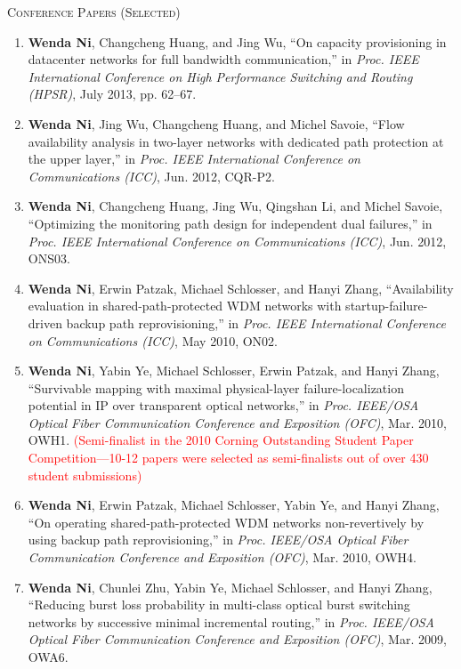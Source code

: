 \documentclass[letterpaper,11pt]{article}
\newcommand{\resheading}[1]{{\noindent\large \colorbox{mygrey}{
\begin{minipage}{1.0\textwidth}{\textsc{#1 \vphantom{p\^{E}}}}\end{minipage}}}}
\begin{document}
\resheading{Conference Papers (Selected)}%

\begin{enumerate}
\item
\textbf{Wenda Ni}, Changcheng Huang, and Jing Wu, ``On capacity provisioning in datacenter networks for full bandwidth communication,'' in \textit{Proc. IEEE International Conference on High Performance Switching and Routing (HPSR)}, July 2013, pp. 62--67.

\item
\textbf{Wenda Ni}, Jing Wu, Changcheng Huang, and Michel Savoie, ``Flow availability analysis in two-layer networks with dedicated path protection at the upper layer,'' in \textit{Proc. IEEE International Conference on Communications (ICC)}, Jun. 2012, CQR-P2.

\item
\textbf{Wenda Ni}, Changcheng Huang, Jing Wu, Qingshan Li, and Michel Savoie, ``Optimizing the monitoring path design for independent dual failures,'' in \textit{Proc. IEEE International Conference on Communications (ICC)}, Jun. 2012, ONS03.

\item
\textbf{Wenda Ni}, Erwin Patzak, Michael Schlosser, and Hanyi Zhang, ``Availability evaluation in shared-path-protected WDM networks with startup-failure-driven backup path reprovisioning,'' in \textit{Proc. IEEE International Conference on Communications (ICC)}, May 2010, ON02.

\item
\textbf{Wenda Ni}, Yabin Ye, Michael Schlosser, Erwin Patzak, and Hanyi Zhang, ``Survivable mapping with maximal physical-layer failure-localization potential in IP over transparent optical networks,'' in \textit{Proc. IEEE/OSA Optical Fiber Communication Conference and Exposition (OFC)}, Mar. 2010, OWH1. \textcolor{Red}{(Semi-finalist in the 2010 Corning Outstanding Student Paper Competition---10-12 papers were selected as semi-finalists out of over 430 student submissions)}


\item
\textbf{Wenda Ni}, Erwin Patzak, Michael Schlosser, Yabin Ye, and Hanyi Zhang, ``On operating shared-path-protected WDM networks non-revertively by using backup path reprovisioning,'' in \textit{Proc. IEEE/OSA Optical Fiber Communication Conference and Exposition (OFC)}, Mar. 2010, OWH4.


\item
\textbf{Wenda Ni}, Chunlei Zhu, Yabin Ye, Michael Schlosser, and Hanyi Zhang, ``Reducing burst loss probability in multi-class optical burst switching networks by successive minimal incremental routing,'' in \textit{Proc. IEEE/OSA Optical Fiber Communication Conference and Exposition (OFC)}, Mar. 2009, OWA6.


\end{enumerate}
\end{document}
